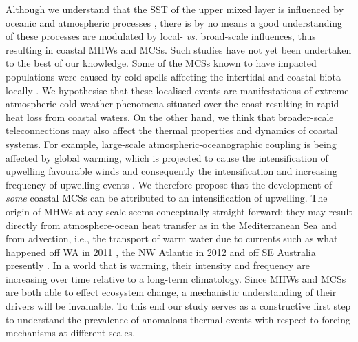\documentclass[a4paper,10pt,review]{elsarticle}
\begin{document}
Although we understand that the SST of the upper mixed layer is influenced by oceanic and atmospheric processes \citep[see Equation 1 of][]{Deser2010}, there is by no means a good understanding of these processes are modulated by local- \emph{vs.} broad-scale influences, thus resulting in coastal MHWs and MCSs. Such studies have not yet been undertaken to the best of our knowledge. Some of the MCSs known to have impacted populations were caused by cold-spells affecting the intertidal and coastal biota locally \citep{Gunter1941, Firth2011}. We hypothesise that these localised events are manifestations of extreme atmospheric cold weather phenomena situated over the coast resulting in rapid heat loss from coastal waters. On the other hand, we think that broader-scale teleconnections may also affect the thermal properties and dynamics of coastal systems. For example, large-scale atmospheric-oceanographic coupling is being affected by global warming, which is projected to cause the intensification of upwelling favourable winds and consequently the intensification and increasing frequency of upwelling events \citep[see][for a review of this and alternative hypotheses]{Garcia-Reyes2015}. We therefore propose that the development of \emph{some} coastal MCSs can be attributed to an intensification of upwelling. The origin of MHWs at any scale seems conceptually straight forward: they may result directly from atmosphere-ocean heat transfer as in the Mediterranean Sea \citep[e.g.][]{Garrabou2009} and from advection, i.e., the transport of warm water due to currents such as what happened off WA in 2011 \citep{Feng2013},  the NW Atlantic in 2012 \citep{Chen2015,Mills2012,Chen2014} and off SE Australia presently  . In a world that is warming, their intensity and frequency are increasing over time relative to a long-term climatology. Since MHWs and MCSs are both able to effect ecosystem change, a mechanistic understanding of their drivers will be invaluable. To this end our study serves as a constructive first step to understand the prevalence of anomalous thermal events with respect to forcing mechanisms at different scales.
\end{document}
